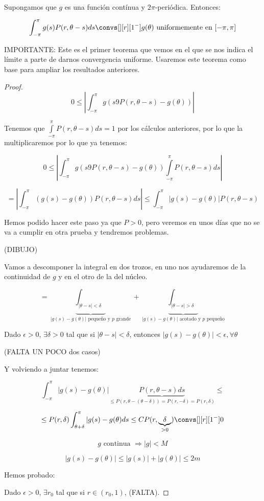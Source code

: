 		\begin{theorem}
			Supongamos que $g$ es una función contínua y $2\pi$-periódica. Entonces:

			\[ \int^\pi_{-\pi} g(s)P(r, \theta-s) ds \convs[][r][1^-] g(\theta) \text{ uniformemente en } [-\pi,\pi] \]

			IMPORTANTE: Este es el primer teorema que vemos en el que se nos indica el límite a parte de darnos convergencia uniforme. Usaremos este teorema como base para ampliar los resultados anteriores.

			\begin{proof}

				\[0 \leq \left| \int_{-\pi}^{\pi} g(s9 P(r, \theta-s) - g(\theta))  \right| \]

				Tenemos que $\int\limits_{-\pi}^{\pi} P(r, \theta-s) ds = 1$ por los cálculos anteriores, por lo que la multiplicaremos por lo que ya tenemos:

				\[0 \leq \left| \int_{-\pi}^{\pi} g(s9 P(r, \theta-s) - g(\theta))  \int\limits_{-\pi}^{\pi} P(r, \theta-s) ds  \right| \]

				\[ = \left| \int_{-\pi}^\pi (g(s) - g(\theta)) P(r, \theta - s) ds \right|  \leq \int^{\pi}_{-\pi} | g(s) - g(\theta) | P(r, \theta- s) \]

				Hemos podido hacer este paso ya que $P>0$, pero veremos en unos días que no se va a cumplir en otra prueba y tendremos problemas.


				(DIBUJO)

				Vamos a descomponer la integral en dos trozos, en uno nos ayudaremos de la continuidad de $g$ y en el otro de la del núcleo.

				\[ = \underbrace{\int_{|\theta-s|< \delta}}_{|g(s) - g(\theta)| \text{ pequeño y }p\text{ grande}} + \underbrace{\int_{|\theta-s| > \delta}}_{|g(s) - g(\theta)| \text{ acotado y }p\text{ pequeño}} \]

				Dado $\epsilon > 0$, $\exists \delta > 0$ tal que si $|\theta-s| < \delta$, entonces $|g(s) - g(\theta)| < \epsilon, \forall \theta$

				(FALTA UN POCO dos casos)

				Y volviendo a juntar tenemos:

				\[ \int^{\pi}_{-\pi} |g(s) - g(\theta) | \underbrace{P(r, \theta-s) ds}_{\leq P(r, \theta-(\theta-\delta)) = P(r, -\delta) = P(r, \delta)} \leq   \]

				\[\leq P(r, \delta) \int^{\pi}_{\theta+\delta} |g(s) - g(\theta) ds \leq C P(r, \underbrace{\delta}_{> 0}) \convs[][r][1^-] 0  \]

				\[g \text{ continua } \Rightarrow |g| < M \]

				\[ |g(s)  - g(\theta)| \leq |g(s)| + | g(\theta) | \leq 2m \]


				Hemos probado:

				Dado $\epsilon > 0$, $\exists r_0$ tal que si $r \in (r_0,1)$, (FALTA).

			\end{proof}

		\end{theorem}

